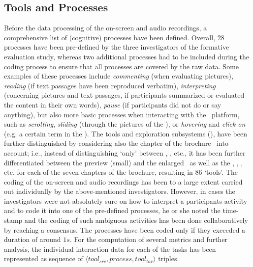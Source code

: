 \subsection{Tools and Processes} \label{sec:tools-and-processes}
Before the data processing of the on-screen and audio recordings, a comprehensive list of (cognitive) processes have been defined.
%
Overall, 28 processes have been pre-defined by the three investigators of the formative evaluation study, whereas two additional processes had to be included during the coding process to ensure that all processes are covered by the raw data. 
%
Some examples of these processes include \emph{commenting} (when evaluating pictures), \emph{reading} (if text passages have been reproduced verbatim), \emph{interpreting} (concerning pictures and text passages, if participants summarized or evaluated the content in their own words), \emph{pause} (if participants did not do or say anything), but also more basic processes when interacting with the \apluschis\ platform, such as \emph{scrolling}, \emph{sliding} (through the pictures of the \is), or \emph{hovering} and \emph{click on} (e.g. a certain term in the \wc). 
%
The tools and exploration subsystems (), have been further distinguished by considering also the chapter of the brochure~\cite{aok} into account; i.e., instead of distinguishing ‘only’ between \ImageSlider, \WordCloud, etc., it has been further differentiated between the preview (small) and the enlarged \ImageSlider\ as well as the \WordCloud, \Tilebar, \Snippets, etc. for each of the seven chapters of the brochure, resulting in 86 ‘tools’.
%
The coding of the on-screen and audio recordings has been to a large extent carried out individually by the above-mentioned investigators.
%
However, in cases the investigators were not absolutely sure on how to interpret a participants activity and to code it into one of the pre-defined processes, he or she noted the time-stamp and the coding of such ambiguous activities has been done collaboratively by reaching a consensus.
%
The processes have been coded only if they exceeded a duration of around $1 \unit{s}$. For the computation of several metrics and further analysis, the individual interaction data for each of the tasks has been represented as sequence of 
$\langle \mathit{tool}_{\mathit{src}}, \mathit{process}, \mathit{tool}_{\mathit{tar}} \rangle$
triples. 



